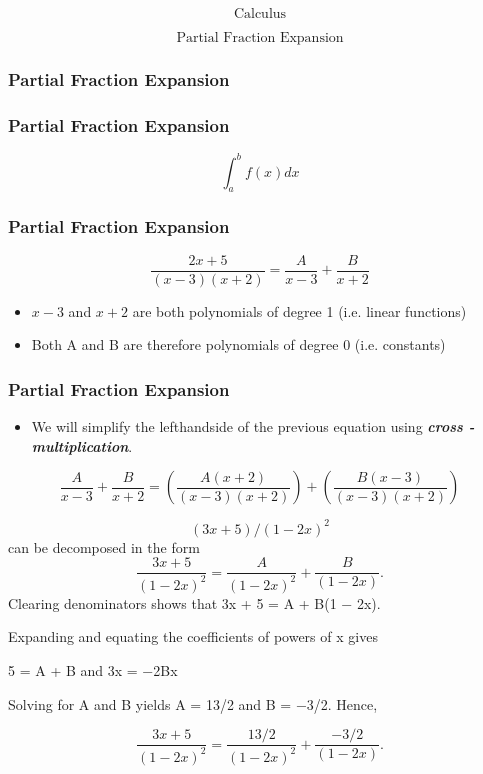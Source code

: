 \documentclass{beamer}
\begin{document}
\begin{frame}

\Huge

\[\mbox{Calculus}\]
\Large

\[\mbox{Partial Fraction Expansion}\]
\end{frame}

\begin{frame}
\frametitle{Partial Fraction Expansion}
\end{frame}
\begin{frame}

\frametitle{Partial Fraction Expansion}
\LARGE
\[ \int^b_a f(x) dx \]

\end{frame}
\begin{frame}
\frametitle{Partial Fraction Expansion}
\LARGE
\[ \frac{2x+5}{(x-3)(x+2)} = \frac{A}{x-3} + \frac{B}{x+2}\]
\begin{itemize}
\item $x-3$ and $x+2$ are both polynomials of degree 1 (i.e. linear functions)
\item Both A and B are therefore polynomials of degree 0 (i.e. constants)
\end{itemize}
\end{frame}
\begin{frame}
\frametitle{Partial Fraction Expansion}
\LARGE
\begin{itemize}
\item We will simplify the lefthandside of the previous equation using \textit{\textbf{cross -multiplication}}.
\end{itemize}
\[\frac{A}{x-3} + \frac{B}{x+2} = \left(\frac{A(x+2)}{(x-3)(x+2)} \right)+ \left(\frac{B(x-3)}{(x-3)(x+2)} \right)\]

\end{frame}

\begin{frame}
\[(3x + 5)/(1 − 2x)^2\] can be decomposed in the form
\[ \frac{3x + 5}{(1-2x)^2} = \frac{A}{(1-2x)^2} + \frac{B}{(1-2x)}. \]
Clearing denominators shows that 3x + 5 = A + B(1 − 2x). 

\end{frame}
\begin{frame}
Expanding and equating the coefficients of powers of x gives

5 = A + B and 3x = −2Bx

Solving for A and B yields A = 13/2 and B = −3/2. Hence,


\[  \frac{3x + 5}{(1-2x)^2} = \frac{13/2}{(1-2x)^2} + \frac{-3/2}{(1-2x)}. \]
\end{frame}
\end{document}
